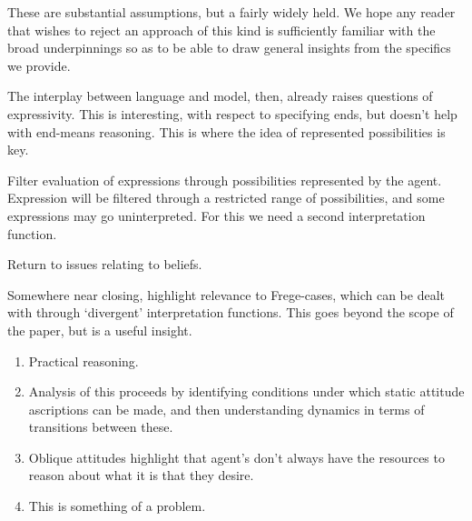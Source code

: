 \documentclass[10pt]{article}
\begin{document}
These are substantial assumptions, but a fairly widely held.
We hope any reader that wishes to reject an approach of this kind is sufficiently familiar with the broad underpinnings so as to be able to draw general insights from the specifics we provide.

The interplay between language and model, then, already raises questions of expressivity.
This is interesting, with respect to specifying ends, but doesn't help with end-means reasoning.
This is where the idea of represented possibilities is key.

Filter evaluation of expressions through possibilities represented by the agent.
Expression will be filtered through a restricted range of possibilities, and some expressions may go uninterpreted.
For this we need a second interpretation function.

Return to issues relating to beliefs.








Somewhere near closing, highlight relevance to Frege-cases, which can be dealt with through `divergent' interpretation functions.
This goes beyond the scope of the paper, but is a useful insight.





\newpage

\begin{enumerate}
\item Practical reasoning.
\item Analysis of this proceeds by identifying conditions under which static attitude ascriptions can be made, and then understanding dynamics in terms of transitions between these.
\item Oblique attitudes highlight that agent's don't always have the resources to reason about what it is that they desire.
\item This is something of a problem.
\end{enumerate}
\end{document}
